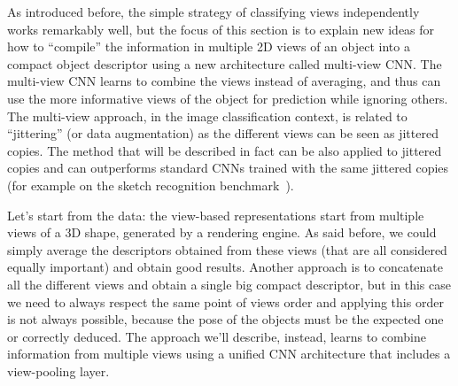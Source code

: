 
As introduced before, the simple strategy of classifying views independently works remarkably well, but the focus of this section is to explain new ideas for how to “compile” the information in multiple 2D views of an object into a compact object descriptor using a new architecture called multi-view CNN. The multi-view CNN learns to combine the views instead of averaging, and thus can use the more informative views of the object for prediction while ignoring others. The multi-view approach, in the image classification context, is related to “jittering” (or data augmentation) as the different views can be seen as jittered copies. The method that will be described in fact can be also applied to jittered copies and can outperforms standard CNNs trained with the same jittered copies (for example on the sketch recognition benchmark~\cite{eitz2012hdhso}).

Let's start from the data: the view-based representations start from multiple views of a 3D shape, generated by a rendering engine. As said before, we could simply average the descriptors obtained from these views (that are all considered equally important) and obtain good results. Another approach is to concatenate all the different views and obtain a single big compact descriptor, but in this case we need to always respect the same point of views order and applying this order is not always possible, because the pose of the objects must be the expected one or correctly deduced.
The approach we'll describe, instead, learns to combine information from multiple views using a unified CNN architecture that includes a view-pooling layer.

